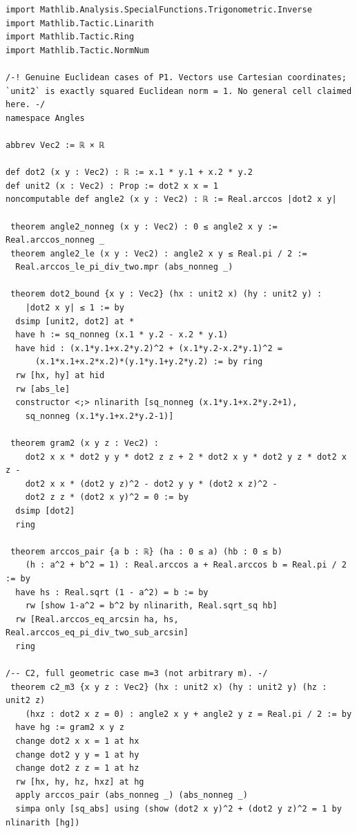 \documentclass[11pt,a4paper]{article}
\begin{document}
\begin{Verbatim}[breaklines,breakanywhere,fontsize=\footnotesize]
import Mathlib.Analysis.SpecialFunctions.Trigonometric.Inverse
import Mathlib.Tactic.Linarith
import Mathlib.Tactic.Ring
import Mathlib.Tactic.NormNum

/-! Genuine Euclidean cases of P1. Vectors use Cartesian coordinates;
`unit2` is exactly squared Euclidean norm = 1. No general cell claimed here. -/
namespace Angles

abbrev Vec2 := ℝ × ℝ

def dot2 (x y : Vec2) : ℝ := x.1 * y.1 + x.2 * y.2
def unit2 (x : Vec2) : Prop := dot2 x x = 1
noncomputable def angle2 (x y : Vec2) : ℝ := Real.arccos |dot2 x y|

 theorem angle2_nonneg (x y : Vec2) : 0 ≤ angle2 x y := Real.arccos_nonneg _
 theorem angle2_le (x y : Vec2) : angle2 x y ≤ Real.pi / 2 :=
  Real.arccos_le_pi_div_two.mpr (abs_nonneg _)

 theorem dot2_bound {x y : Vec2} (hx : unit2 x) (hy : unit2 y) :
    |dot2 x y| ≤ 1 := by
  dsimp [unit2, dot2] at *
  have h := sq_nonneg (x.1 * y.2 - x.2 * y.1)
  have hid : (x.1*y.1+x.2*y.2)^2 + (x.1*y.2-x.2*y.1)^2 =
      (x.1*x.1+x.2*x.2)*(y.1*y.1+y.2*y.2) := by ring
  rw [hx, hy] at hid
  rw [abs_le]
  constructor <;> nlinarith [sq_nonneg (x.1*y.1+x.2*y.2+1),
    sq_nonneg (x.1*y.1+x.2*y.2-1)]

 theorem gram2 (x y z : Vec2) :
    dot2 x x * dot2 y y * dot2 z z + 2 * dot2 x y * dot2 y z * dot2 x z -
    dot2 x x * (dot2 y z)^2 - dot2 y y * (dot2 x z)^2 -
    dot2 z z * (dot2 x y)^2 = 0 := by
  dsimp [dot2]
  ring

 theorem arccos_pair {a b : ℝ} (ha : 0 ≤ a) (hb : 0 ≤ b)
    (h : a^2 + b^2 = 1) : Real.arccos a + Real.arccos b = Real.pi / 2 := by
  have hs : Real.sqrt (1 - a^2) = b := by
    rw [show 1-a^2 = b^2 by nlinarith, Real.sqrt_sq hb]
  rw [Real.arccos_eq_arcsin ha, hs, Real.arccos_eq_pi_div_two_sub_arcsin]
  ring

/-- C2, full geometric case m=3 (not arbitrary m). -/
 theorem c2_m3 {x y z : Vec2} (hx : unit2 x) (hy : unit2 y) (hz : unit2 z)
    (hxz : dot2 x z = 0) : angle2 x y + angle2 y z = Real.pi / 2 := by
  have hg := gram2 x y z
  change dot2 x x = 1 at hx
  change dot2 y y = 1 at hy
  change dot2 z z = 1 at hz
  rw [hx, hy, hz, hxz] at hg
  apply arccos_pair (abs_nonneg _) (abs_nonneg _)
  simpa only [sq_abs] using (show (dot2 x y)^2 + (dot2 y z)^2 = 1 by nlinarith [hg])


\end{Verbatim}
\end{document}
